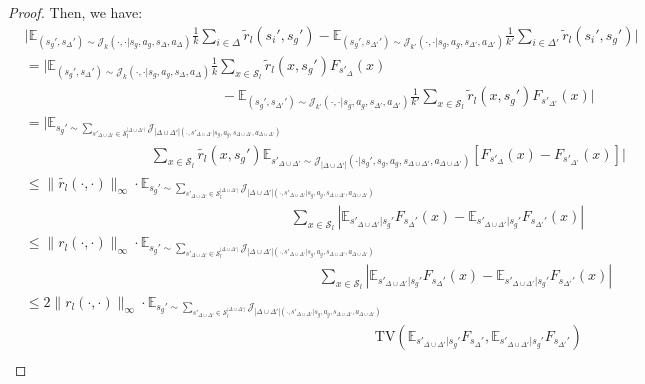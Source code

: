 \documentclass{article}
\theoremstyle{plain}
\theoremstyle{definition}
\def\E{\mathbb{E}}
\begin{document}
\begin{proof}
Then, we have:
\begin{align*}
&\bigg|\E_{(s_g',s_\Delta')\sim\mathcal{J}_k(\cdot,\cdot|s_g,a_g,s_\Delta,a_\Delta)}\frac{1}{k}\sum_{i\in\Delta}\tilde{r}_l(s_i',s_g')- \E_{(s_g',s_{\Delta'}')\sim\mathcal{J}_{k'}(\cdot,\cdot|s_g,a_g,s_{\Delta'}, a_{\Delta'})}\frac{1}{k'}\sum_{i\in\Delta'}\tilde{r}_l(s_i',s_g')\bigg| \\
&= \bigg|\E_{(s_g',s_\Delta')\sim\mathcal{J}_k(\cdot,\cdot|s_g,a_g,s_\Delta,a_\Delta)}\frac{1}{k}\sum_{x\in\mathcal{S}_l}\tilde{r}_l(x,s_g')F_{s'_\Delta}(x)\\ &\quad\quad\quad\quad\quad\quad\quad\quad\quad\quad\quad\quad\quad\quad- \E_{(s_g',s_{\Delta'}')\sim\mathcal{J}_{k'}(\cdot,\cdot|s_g,a_g,s_{\Delta'}, a_{\Delta'})}\frac{1}{k'}\sum_{x\in\mathcal{S}_l}\tilde{r}_l(x,s_g')F_{s'_{\Delta'}}(x)\bigg| \\
&= \bigg|\E_{s_g'\sim \sum_{s'_{\Delta\cup\Delta'}\in\mathcal{S}_l^{|\Delta\cup\Delta'|}}\mathcal{J}_{|\Delta\cup\Delta'|(\cdot,s'_{\Delta\cup\Delta'}|s_g,a_g,s_{\Delta\cup\Delta'},a_{\Delta\cup\Delta'})}}\\ &\quad\quad\quad\quad\quad\quad\quad\quad\quad \sum_{x\in\mathcal{S}_l}\tilde{r_l}(x,s_g')\E_{s'_{\Delta\cup\Delta'}\sim\mathcal{J}_{|\Delta\cup\Delta'|}(\cdot|s_g',s_g,a_g,s_{\Delta\cup\Delta'},a_{\Delta\cup\Delta'})}[F_{s'_\Delta}(x) - F_{s'_{\Delta'}}(x)]\bigg| \\
&\leq \|\tilde{r_l}(\cdot,\cdot)\|_\infty \cdot \E_{s_g'\sim \sum_{s'_{\Delta\cup\Delta'}\in\mathcal{S}_l^{|\Delta\cup\Delta'|}}\mathcal{J}_{|\Delta\cup\Delta'|(\cdot,s'_{\Delta\cup\Delta'}|s_g,a_g,s_{\Delta\cup\Delta'},a_{\Delta\cup\Delta'})}}\\ &\quad\quad\quad\quad\quad\quad\quad\quad\quad\quad\quad\quad\quad\quad\quad\quad\quad\quad\quad\sum_{x\in\mathcal{S}_l}|\E_{s'_{\Delta\cup\Delta'}|s_g'} F_{s_\Delta'}(x) - \E_{s'_{\Delta\cup\Delta'}|s_g'} F_{s_{\Delta'}'}(x)| \\
&\leq \|{r_l}(\cdot,\cdot)\|_\infty \cdot \E_{s_g'\sim \sum_{s'_{\Delta\cup\Delta'}\in\mathcal{S}_l^{|\Delta\cup\Delta'|}}\mathcal{J}_{|\Delta\cup\Delta'|(\cdot,s'_{\Delta\cup\Delta'}|s_g,a_g,s_{\Delta\cup\Delta'},a_{\Delta\cup\Delta'})}}\\ &\quad\quad\quad\quad\quad\quad\quad\quad\quad\quad\quad\quad\quad\quad\quad\quad\quad\quad\quad\quad\quad\sum_{x\in\mathcal{S}_l}|\E_{s'_{\Delta\cup\Delta'}|s_g'} F_{s_\Delta'}(x) - \E_{s'_{\Delta\cup\Delta'}|s_g'} F_{s_{\Delta'}'}(x)| \\
&\leq 2\|r_l(\cdot,\cdot)\|_\infty \cdot \E_{s_g'\sim \sum_{s'_{\Delta\cup\Delta'}\in\mathcal{S}_l^{|\Delta\cup\Delta'|}}\mathcal{J}_{|\Delta\cup\Delta'|(\cdot,s'_{\Delta\cup\Delta'}|s_g,a_g,s_{\Delta\cup\Delta'},a_{\Delta\cup\Delta'})}}\\ &\quad\quad\quad\quad\quad\quad\quad\quad\quad\quad\quad\quad\quad\quad\quad\quad\quad\quad\quad\quad\quad\quad\quad\quad\quad \mathrm{TV}(\E_{s'_{\Delta\cup\Delta'}|s_g'} F_{s_\Delta'}, \E_{s'_{\Delta\cup\Delta'}|s_g'} F_{s_{\Delta'}'}) \\

\end{align*}
\end{proof}
\end{document}
